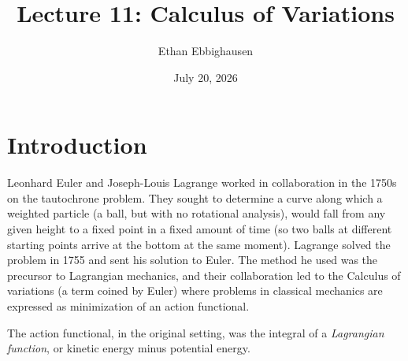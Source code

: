 \documentclass{article}
\title{Lecture 11: Calculus of Variations}
\author{Ethan Ebbighausen}
\date{July 20, 2026}
\begin{document}
	\pagestyle{fancy}
	\fancyfoot{} 
	
	\maketitle
	
	\section{Introduction}
	
	Leonhard Euler and Joseph-Louis Lagrange worked in collaboration in the 1750s on the tautochrone problem. They sought to determine a curve along which a weighted particle (a ball, but with no rotational analysis), would fall from any given height to a fixed point in a fixed amount of time (so two balls at different starting points arrive at the bottom at the same moment). Lagrange solved the problem in 1755 and sent his solution to Euler. The method he used was the precursor to Lagrangian mechanics, and their collaboration led to the Calculus of variations (a term coined by Euler) where problems in classical mechanics are expressed as minimization of an action functional. 
	
	The action functional, in the original setting, was the integral of a \textit{Lagrangian function}, or kinetic energy minus potential energy. 
	
%	
%	
%	
	
\end{document}
